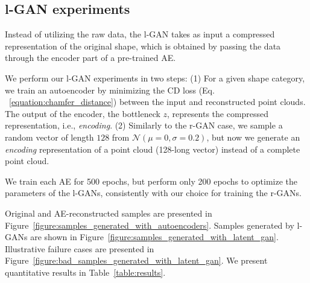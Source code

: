 \documentclass[12pt]{article}
\begin{document}
    \subsection{l-GAN experiments} Instead of utilizing the raw data, the l-GAN takes as input a compressed representation of the original shape, which is obtained by passing the data through the encoder part of a pre-trained AE.

    We perform our l-GAN experiments in two steps:
    (1) For a given shape category, we train an autoencoder by minimizing the CD loss (Eq. ~\eqref{equation:chamfer_distance}) between the input and reconstructed point clouds. The output of the encoder, the bottleneck $z$, represents the compressed representation, i.e., \textit{encoding}.
    (2) Similarly to the r-GAN case, we sample a random vector of length $128$ from $\mathcal{N}(\mu=0,\sigma=0.2)$, but now we generate an \textit{encoding} representation of a point cloud (128-long vector) instead of a complete point cloud.

    We train each AE for 500 epochs, but perform only 200 epochs to optimize the parameters of the l-GANs, consistently with our choice for training the r-GANs.

    Original and AE-reconstructed samples are presented in Figure~\ref{figure:samples_generated_with_autoencoders}. Samples generated by l-GANs are shown in Figure~\ref{figure:samples_generated_with_latent_gan}. Illustrative failure cases are presented in Figure~\ref{figure:bad_samples_generated_with_latent_gan}. We present quantitative results in Table~\ref{table:results}.


\end{document}
